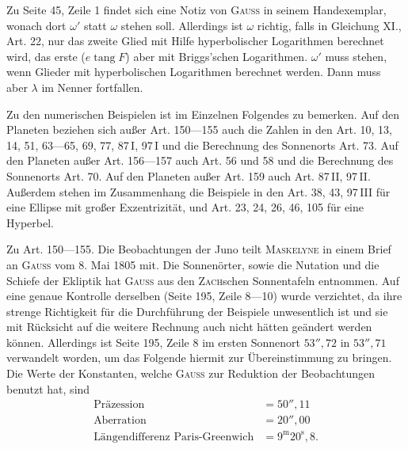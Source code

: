 \hypertarget{native-291-remarks}{}
Zu Seite 45, Zeile 1 findet sich eine Notiz von \textsc{Gauss} in seinem Handexemplar,
wonach dort $\omega'$ statt $\omega$ stehen soll. Allerdings ist $\omega$ richtig, falls in
Gleichung XI., Art. 22, nur das zweite Glied mit Hilfe hyperbolischer Logarithmen berechnet
wird, das erste ($e\operatorname{tang} F$) aber mit Briggs’schen Logarithmen. $\omega'$ muss stehen, wenn 
Glieder mit hyperbolischen Logarithmen berechnet werden. Dann muss aber $\lambda$ im
Nenner fortfallen.

Zu den numerischen Beispielen ist im Einzelnen Folgendes zu bemerken. Auf den Planeten
 beziehen sich außer Art. 150---155 auch die Zahlen in den Art. 10, 13, 14, 51,
63---65, 69, 77, 87\,I, 97\,I und die Berechnung des Sonnenorts Art. 73. Auf den Planeten
 außer Art. 156---157 auch Art. 56 und 58 und die Berechnung des Sonnenorts
Art. 70. Auf den Planeten  außer Art. 159 auch Art. 87\,II, 97\,II. Außerdem stehen
im Zusammenhang die Beispiele in den Art. 38, 43, 97\,III für eine Ellipse mit großer
Exzentrizität, und Art. 23, 24, 26, 46, 105 für eine Hyperbel.

Zu Art. 150---155. Die Beobachtungen der Juno teilt \textsc{Maskelyne} in einem Brief an
\textsc{Gauss} vom 8. Mai 1805 mit. Die Sonnenörter, sowie die Nutation und die Schiefe der
Ekliptik hat \textsc{Gauss} aus den \textsc{Zach}schen Sonnentafeln entnommen. Auf eine
genaue Kontrolle derselben (Seite 195, Zeile 8---10) wurde verzichtet, da ihre strenge
Richtigkeit für die Durchführung der Beispiele unwesentlich ist und sie mit Rücksicht auf
die weitere Rechnung auch nicht hätten geändert werden können. Allerdings ist Seite 195, Zeile 8
im ersten Sonnenort $53''{,}72$ in $53''{,}71$ verwandelt worden, um das Folgende hiermit zur
Übereinstimmung zu bringen. Die Werte der Konstanten, welche \textsc{Gauss} zur Reduktion
der Beobachtungen benutzt hat, sind
\[
\begin{aligned}
\text{Präzession}&=50''{,}11\\
\text{Aberration}&=20''{,}00\\
\text{Längendifferenz Paris-Greenwich}&=9^{\mathrm m}20^{\mathrm s}{,}8.
\end{aligned}
\]

